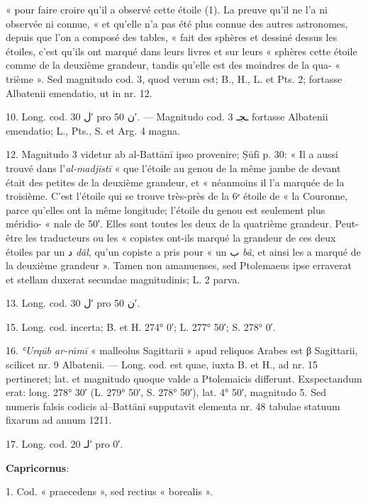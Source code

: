 \documentclass[11pt]{article}
\newcommand{\AbjadZero}{{\NallinoSigns\symbol{"E000}}}
\newcommand{\Name}[1]{{\addfontfeatures{LetterSpace=12}#1}}
\begin{document}
{\small
\par\hangindent=12mm « pour faire croire qu’il a observé cette étoile (1). La preuve qu’il ne l’a ni observée ni connue, « et qu’elle n’a pas été plus connue des autres astronomes, depuis que l’on a composé des tables, « fait des sphères et dessiné dessus les étoiles, c’est qu’ils ont marqué dans leurs livres et sur leurs « sphères cette étoile comme de la deuxième grandeur, tandis qu’elle est des moindres de la qua- « trième ». Sed magnitudo cod. 3, quod verum est; B., H., L. et Pts. 2; fortasse Albatenii emendatio, ut in nr. 12.
\par\hangindent=12mm 10. Long. cod. \textarabic{ل} 30′ pro \textarabic{ن} 50′. — Magnitudo cod. \textarabic{ـجـ} 3 fortasse Albatenii emendatio; L., Pts., S. et Arg. 4 magna.
\par\hangindent=12mm 12. Magnitudo 3 videtur ab al-Battānī ipso provenire; \Name{Ṣūfī} p. 30: « Il a aussi trouvé dans l’\textit{al-madjistī} « que l’étoile au genou de la même jambe de devant était des petites de la deuxième grandeur, et « néanmoins il l’a marquée de la troisième. C’est l’étoile qui se trouve très-près de la 6ᵉ étoile de « la Couronne, parce qu’elles ont la même longitude; l’étoile du genou est seulement plus méridio- « nale de 50′. Elles sont toutes les deux de la quatrième grandeur. Peut-être les traducteurs ou les « copistes ont-ils marqué la grandeur de ces deux étoiles par un \textarabic{د} \textit{dâl}, qu’un copiste a pris pour « un \textarabic{ب} \textit{bâ}, et ainsi les a marqué de la deuxième grandeur ». Tamen non amanuenses, sed Ptolemaeus ipse erraverat et stellam duxerat secundae magnitudinis; L. 2 parva.
\par\hangindent=12mm 13. Long. cod. \textarabic{ل} 30′ pro \textarabic{ن} 50′.
\par\hangindent=12mm 15. Long. cod. incerta; B. et H. 274° 0′; L. 277° 50′; S. 278° 0′.
\par\hangindent=12mm 16. \textit{ʿUrqūb ar-rāmī} « malleolus Sagittarii » apud reliquos Arabes est β Sagittarii, scilicet nr. 9 Albatenii. — Long. cod. est quae, iuxta B. et H., ad nr. 15 pertineret; lat. et magnitudo quoque valde a Ptolemaicis differunt. Exspectandum erat: long. 278° 30′ (L. 279° 50′, S. 278° 50′), lat. 4° 50′, magnitudo 5. Sed numeris falsis codicis al–Battānī supputavit elementa nr. 48 tabulae statuum fixarum ad annum 1211.
\par\hangindent=12mm 17. Long. cod. \textarabic{لـ} 20′ pro \textarabic{\AbjadZero{}} 0′.
\par\hspace*{8mm}\textbf{Capricornus}:
\par\hangindent=12mm 1. Cod. « praecedens », sed rectius « borealis ».
\par}
\end{document}
